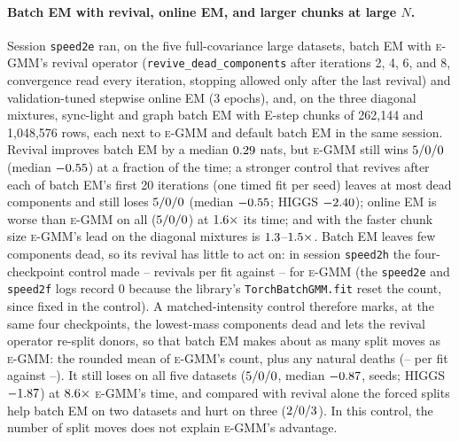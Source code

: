 \documentclass[10pt]{article} %
\newcommand{\egmm}{\textsc{e-GMM}}
\begin{document}
\paragraph{Batch EM with revival, online EM, and larger chunks at large $N$.} Session \texttt{speed2e} ran, on the five full-covariance large datasets, batch EM with \egmm{}'s revival operator (\texttt{revive\_dead\_components} after iterations 2, 4, 6, and 8, convergence read every iteration, stopping allowed only after the last revival) and validation-tuned stepwise online EM (3 epochs), and, on the three diagonal mixtures, sync-light and graph batch EM with E-step chunks of 262{,}144 and 1{,}048{,}576 rows, each next to \egmm{} and default batch EM in the same session. Revival improves batch EM by a median $0.29$ nats, but \egmm{} still wins $5/0/0$ (median $-0.55$) at a fraction of the time; a stronger control that revives after each of batch EM's first 20 iterations (one timed fit per seed) leaves at most \rSfEveryDeadMax{} dead components and still loses $5/0/0$ (median $-0.55$; HIGGS $-2.40$); online EM is worse than \egmm{} on all ($5/0/0$) at $1.6\times$ its time; and with the faster chunk size \egmm{}'s lead on the diagonal mixtures is $1.3$--$1.5\times$. Batch EM leaves few components dead, so its revival has little to act on: in session \texttt{speed2h} the four-checkpoint control made \rShRevMin--\rShRevMax{} revivals per fit against \rShEgRevMin--\rShEgRevMax{} for \egmm{} (the \texttt{speed2e} and \texttt{speed2f} logs record 0 because the library's \texttt{TorchBatchGMM.fit} reset the count, since fixed in the control). A matched-intensity control therefore marks, at the same four checkpoints, the lowest-mass components dead and lets the revival operator re-split donors, so that batch EM makes about as many split moves as \egmm{}: the rounded mean of \egmm{}'s count, plus any natural deaths (\rShForcedMin--\rShForcedMax{} per fit against \rShEgRevMin--\rShEgRevMax{}). It still loses on all five datasets ($5/0/0$, median $-0.87$, \rShForcedSeedWins{} seeds; HIGGS $-1.87$) at $8.6\times$ \egmm{}'s time, and compared with revival alone the forced splits help batch EM on two datasets and hurt on three ($2/0/3$). In this control, the number of split moves does not explain \egmm{}'s advantage.
\end{document}
